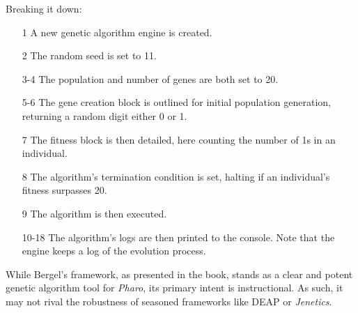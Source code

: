   Breaking it down:

  \begin{enumerate}
    \item[1] A new genetic algorithm engine is created.
    \item[2] The random seed is set to 11. 
    \item[3-4] The population and number of genes are both set to 20.
    \item[5-6] The gene creation block is outlined for initial population 
      generation, returning a random digit either 0 or 1.
    \item[7] The fitness block is then detailed, here counting the number of 
      1s in an individual.
    \item[8] The algorithm's termination condition is set, halting if an 
      individual's fitness surpasses 20.
    \item[9] The algorithm is then executed.
    \item[10-18] The algorithm's logs are then printed to the console.
      Note that the engine keeps a log of the evolution process.
  \end{enumerate}

  While Bergel's framework, as presented in the book, stands as a clear and 
  potent genetic algorithm tool for \textit{Pharo}, its primary intent is 
  instructional.
  As such, it may not rival the robustness of seasoned frameworks like DEAP or 
  \textit{Jenetics}.
